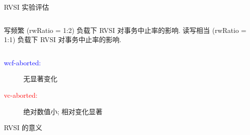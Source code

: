 \begin{frame}{RVSI 实验评估}
  \begin{columns}
		{写频繁 (rwRatio = 1:2) 负载下 RVSI 对事务中止率的影响.}
		{读写相当 (rwRatio = 1:1) 负载下 RVSI 对事务中止率的影响.}
  \end{columns}

  \begin{description}
	\item[\textcolor{blue}{wcf-aborted:}] 无显著变化
	\item[\textcolor{red}{vc-aborted:}] 绝对数值小; 相对变化显著 
  \end{description}
\end{frame}
\begin{frame}{RVSI 的意义}
\end{frame}
